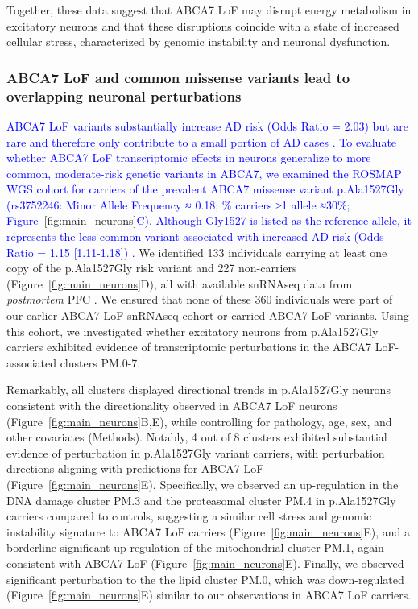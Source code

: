 Together, these data suggest that ABCA7 LoF may disrupt energy metabolism in excitatory neurons and that these disruptions coincide with a state of increased cellular stress, characterized by genomic instability and neuronal dysfunction.

\subsubsection{ABCA7 LoF and common missense variants lead to overlapping neuronal perturbations}
\newcommand{\quoteL}{\textcolor{blue}{ABCA7 LoF variants substantially increase AD risk (Odds Ratio = 2.03) \cite{Steinberg2015-mu} but are rare and therefore only contribute to a small portion of AD cases \cite{Duchateau2024-rf}. To evaluate whether ABCA7 LoF transcriptomic effects in neurons generalize to more common, moderate-risk genetic variants in ABCA7, we examined the ROSMAP WGS cohort for carriers of the prevalent ABCA7 missense variant p.Ala1527Gly (rs3752246: Minor Allele Frequency ≈ 0.18; \% carriers ≥1 allele ≈30\%; Figure~\ref{fig:main_neurons}C). Although Gly1527 is listed as the reference allele, it represents the less common variant associated with increased AD risk (Odds Ratio = 1.15 [1.11-1.18]) \cite{Kunkle2019-yo,Holstege2022-vp,Naj2011-bs}. \label{quoteL-label}}} 
\quoteL We identified 133 individuals carrying at least one copy of the p.Ala1527Gly risk variant and 227 non-carriers (Figure~\ref{fig:main_neurons}D), all with available snRNAseq data from \textit{postmortem} PFC \cite{Mathys2023-rs}. We ensured that none of these 360 individuals were part of our earlier ABCA7 LoF snRNAseq cohort or carried ABCA7 LoF variants. Using this cohort, we investigated whether excitatory neurons from p.Ala1527Gly carriers exhibited evidence of transcriptomic perturbations in the ABCA7 LoF-associated clusters PM.0-7.

Remarkably, all clusters displayed directional trends in p.Ala1527Gly neurons consistent with the directionality observed in ABCA7 LoF neurons (Figure~\ref{fig:main_neurons}B,E), while controlling for pathology, age, sex, and other covariates (Methods). Notably, 4 out of 8 clusters exhibited substantial evidence of perturbation in p.Ala1527Gly variant carriers, with perturbation directions aligning with predictions for ABCA7 LoF (Figure~\ref{fig:main_neurons}E). Specifically, we observed an up-regulation in the DNA damage cluster PM.3 and the proteasomal cluster PM.4 in p.Ala1527Gly carriers compared to controls, suggesting a similar cell stress and genomic instability signature to ABCA7 LoF carriers (Figure~\ref{fig:main_neurons}E), and a borderline significant up-regulation of the mitochondrial cluster PM.1, again consistent with ABCA7 LoF (Figure~\ref{fig:main_neurons}E). Finally, we observed significant perturbation to the the lipid cluster PM.0, which was down-regulated (Figure~\ref{fig:main_neurons}E) similar to our observations in ABCA7 LoF carriers. 

